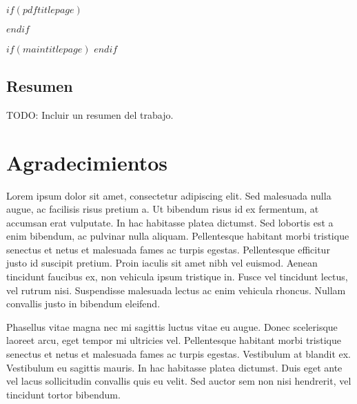 \frontmatter


$if(pdftitlepage)$

\cleardoublepage
$endif$

$if(maintitlepage)$
$endif$


\makeatletter
\begin{center} %
\chapter*{Resumen} %
\end{center}   
\makeatother
TODO: Incluir un resumen del trabajo.

\chapter*{Agradecimientos} %

Lorem ipsum dolor sit amet, consectetur adipiscing elit. Sed malesuada nulla augue, ac facilisis risus pretium a. Ut bibendum risus id ex fermentum, at accumsan erat vulputate. In hac habitasse platea dictumst. Sed lobortis est a enim bibendum, ac pulvinar nulla aliquam. Pellentesque habitant morbi tristique senectus et netus et malesuada fames ac turpis egestas. Pellentesque efficitur justo id suscipit pretium. Proin iaculis sit amet nibh vel euismod. Aenean tincidunt faucibus ex, non vehicula ipsum tristique in. Fusce vel tincidunt lectus, vel rutrum nisi. Suspendisse malesuada lectus ac enim vehicula rhoncus. Nullam convallis justo in bibendum eleifend.

Phasellus vitae magna nec mi sagittis luctus vitae eu augue. Donec scelerisque laoreet arcu, eget tempor mi ultricies vel. Pellentesque habitant morbi tristique senectus et netus et malesuada fames ac turpis egestas. Vestibulum at blandit ex. Vestibulum eu sagittis mauris. In hac habitasse platea dictumst. Duis eget ante vel lacus sollicitudin convallis quis eu velit. Sed auctor sem non nisi hendrerit, vel tincidunt tortor bibendum.


